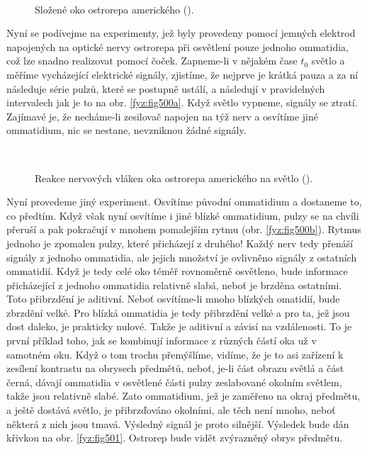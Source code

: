     \begin{figure}[hb!] %
      \centering
       \\
      \caption{Složené oko ostrorepa amerického (\cite[s.~601]{Feynman01}).}
      \label{fyz:fig499}
    \end{figure}

    Nyní se podívejme na experimenty, jež byly provedeny pomocí jemných elektrod napojených na
    optické nervy ostrorepa při osvětlení pouze jednoho ommatidia, což lze snadno realizovat pomocí
    čoček. Zapneme-li v nějakém čase \(t_0\) světlo a měříme vycházející elektrické signály,
    zjistíme, že nejprve je krátká pauza a za ní následuje série pulzů, které se postupně ustálí, a
    následují v pravidelných intervalech jak je to na obr. \ref {fyz:fig500a}. Když světlo vypneme,
    signály se ztratí. Zajímavé je, že necháme-li zesilovač napojen na týž nerv a osvítíme jiné
    ommatidium, nic se nestane, nevzniknou žádné signály.

    \begin{figure}[hb!] %
      \centering
        \\
      \caption{Reakce nervových vláken oka ostrorepa amerického na světlo (\cite[s.~601]{Feynman01}).}
      \label{fyz:fig500}
    \end{figure}

    Nyní provedeme jiný experiment. Osvítíme původní ommatidium a dostaneme to, co předtím. Když
    však nyní osvítíme i jiné blízké ommatidium, pulzy se na chvíli přeruší a pak pokračují v mnohem
    pomalejším rytmu (obr. \ref{fyz:fig500b}). Rytmus jednoho je zpomalen pulzy, které přicházejí z
    druhého! Každý nerv tedy přenáší signály z jednoho ommatidia, ale jejich množství je ovlivněno
    signály z ostatních ommatidií. Když je tedy celé oko téměř rovnoměrně osvětleno, bude informace
    přicházející z jednoho ommatidia relativně slabá, neboť je brzděna ostatními. Toto přibrzdění je
    aditivní. Neboť osvítíme-li mnoho blízkých omatidií, bude zbrzdění velké. Pro blízká ommatidia
    je tedy přibrzdění velké a pro ta, jež jsou dost daleko, je prakticky nulové. Takže je aditivní
    a závisí na vzdálenosti. To je první příklad toho, jak se kombinují informace z různých částí
    oka už v samotném oku. Když o tom trochu přemýšlíme, vidíme, že je to asi zařízení k zesílení
    kontrastu na obrysech předmětů, neboť, je-li část obrazu světlá a část černá, dávají ommatidia v
    osvětlené části pulzy zeslabované okolním světlem, takže jsou relativně slabé. Zato ommatidium,
    jež je zaměřeno na okraj předmětu, a ještě dostává světlo, je přibrzďováno okolními, ale těch
    není mnoho, neboť některá z nich jsou tmavá. Výsledný signál je proto silnější. Výsledek bude
    dán křivkou na obr. \ref{fyz:fig501}. Ostrorep bude vidět zvýrazněný obrys předmětu.
    
